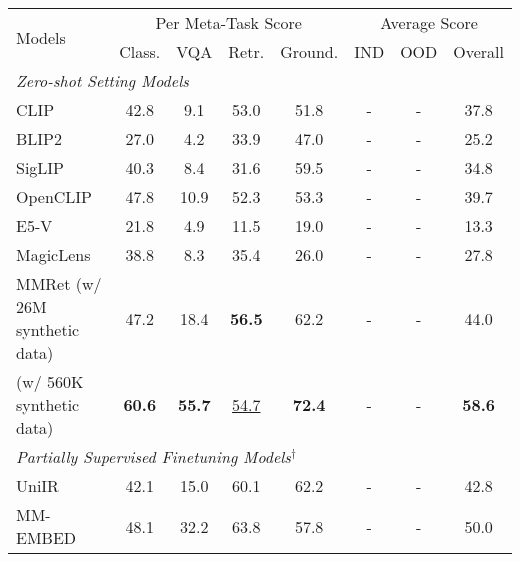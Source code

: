 \begin{table*}[h]
\centering
\small
\begin{tabular}{lccccccc}
\toprule
\multirow{2}{*}{{Models}}  & \multicolumn{4}{c}{{Per Meta-Task Score}}       &\multicolumn{3}{c}{{Average Scor}e} \\
\cmidrule(r){2-5}
\cmidrule(l){6-8}
 & Class. & VQA  & Retr. & Ground. &  IND  & OOD & Overall                     \\
\midrule
\multicolumn{7}{l}{\textit{Zero-shot Setting Models}}                   \\
CLIP~\cite{CLIP}                                                        & 42.8           & 9.1  & 53.0      & 51.8   & - & -  & 37.8                     \\
BLIP2~\cite{blip2}                                                       & 27.0           & 4.2  & 33.9      & 47.0  & - & -   & 25.2                     \\
SigLIP~\cite{SigLIP}                                                         & 40.3           & 8.4  & 31.6      & 59.5  & - & -   & 34.8                     \\
OpenCLIP~\cite{OpenCLIP}                                                & {47.8}           & 10.9 & 52.3      & 53.3   & - & -  & 39.7                     \\
E5-V~\cite{E5-V}                                           & 21.8           & 4.9  & 11.5      & 19.0    & - & - & 13.3    \\
MagicLens~\cite{MagicLens}                                                 & 38.8           & 8.3  & 35.4      & 26.0   & - & -   & 27.8                     \\
MMRet (w/ 26M synthetic data) & {47.2}           & {18.4} & \textbf{56.5}      & {62.2}      & - & -     & {44.0} \\
\rowcolor{gray!20}
{\ours{}} (w/ 560K synthetic data)             & \textbf{60.6}           & \textbf{55.7} & \underline{54.7}      & \textbf{72.4}      & - & -     & \textbf{58.6}  \\
\midrule
\multicolumn{7}{l}{\textit{Partially Supervised Finetuning Models}$^\dag$}     \\ 
UniIR~\cite{UniIR}                                   & 42.1           & {15.0} & {60.1}      & {62.2}  & -  & -  & {42.8}                     \\
MM-EMBED~\cite{mmembed}     & {48.1}           & {32.2} & {63.8}      & {57.8}      & - & -     & {50.0} \\

\end{tabular}
\end{table*}
